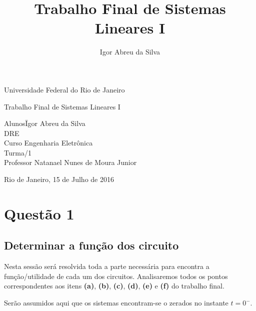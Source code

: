 \documentclass[a4paper, 12pt]{article}
\author{Igor Abreu da Silva}
\title{Trabalho Final de Sistemas Lineares I}
\begin{document}
	
	\begin{titlepage}
		\begin{center}
			\huge{Universidade Federal do Rio de Janeiro}
			\vspace{95pt}

			\large{Trabalho Final de Sistemas Lineares I}
			\vspace{160pt}
		\end{center}
		
		\begin{flushleft}
			\begin{tabbing}
				Alunos\qquad\qquad\= Igor Abreu da Silva\\
				DRE \\
				Curso\> Engenharia Eletrônica \\
				Turma/1 \\
				Professor\> Natanael Nunes de Moura Junior \\
			
			\end{tabbing}
			
		\end{flushleft}
		
		\begin{center}
			\vspace{\fill}
			Rio de Janeiro, 15 de Julho de 2016
		\end{center}
	\end{titlepage}


	\newpage
	\tableofcontents
	\listoffigures
	\thispagestyle{empty}
	
	\newpage
	
	\section{Quest\~{a}o 1}
		\subsection{Determinar a função dos circuito}
			Nesta sessão será resolvida toda a parte necessária para encontra a função/utilidade de cada um dos circuitos. Analisaremos todos os pontos correspondentes aos itens \textbf{(a)}, \textbf{(b)}, \textbf{(c)}, \textbf{(d)}, \textbf{(e)} e \textbf{(f)} do trabalho final. 
			
			
			Serão assumidos aqui que os sistemas encontram-se o zerados no instante $t = 0^{-}$.
\end{document}
